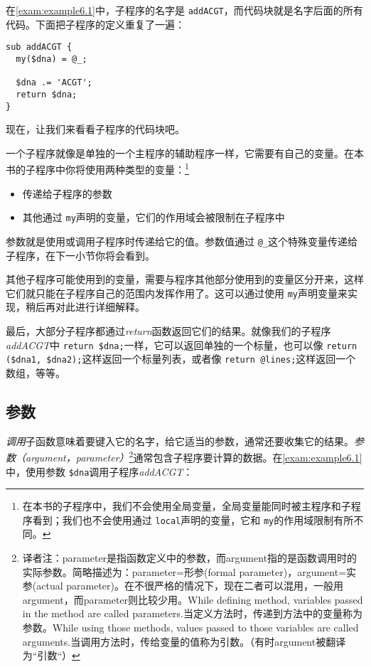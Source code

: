 在\autoref{exam:example6.1}中，子程序的名字是  \verb|addACGT|，而代码块就是名字后面的所有代码。下面把子程序的定义重复了一遍：

\begin{lstlisting}
sub addACGT {
  my($dna) = @_;

  $dna .= 'ACGT';
  return $dna;
}
\end{lstlisting}

现在，让我们来看看子程序的代码块吧。

一个子程序就像是单独的一个主程序的辅助程序一样，它需要有自己的变量。在本书的子程序中你将使用两种类型的变量：\footnote{在本书的子程序中，我们不会使用全局变量，全局变量能同时被主程序和子程序看到；我们也不会使用通过  \verb|local|声明的变量，它和  \verb|my|的作用域限制有所不同。}

\begin{itemize}
  \item 传递给子程序的参数
  \item 其他通过 \verb|my|声明的变量，它们的作用域会被限制在子程序中
\end{itemize}

参数就是使用或调用子程序时传递给它的值。参数值通过 \verb|@_|这个特殊变量传递给子程序，在下一小节你将会看到。

其他子程序可能使用到的变量，需要与程序其他部分使用到的变量区分开来，这样它们就只能在子程序自己的范围内发挥作用了。这可以通过使用 \verb|my|声明变量来实现，稍后再对此进行详细解释。

最后，大部分子程序都通过\textit{return}函数返回它们的结果。就像我们的子程序\textit{addACGT}中 \verb|return $dna;|一样，它可以返回单独的一个标量，也可以像 \verb|return ($dna1, $dna2);|这样返回一个标量列表，或者像 \verb|return @lines;|这样返回一个数组，等等。

\subsection{参数}
\textit{调用}子函数意味着要键入它的名字，给它适当的参数，通常还要收集它的结果。\textit{参数（argument，parameter）}\footnote{译者注：parameter是指函数定义中的参数，而argument指的是函数调用时的实际参数。简略描述为：parameter=形参(formal parameter)，argument=实参(actual parameter)。在不很严格的情况下，现在二者可以混用，一般用argument，而parameter则比较少用。While defining method, variables passed in the method are called parameters.当定义方法时，传递到方法中的变量称为参数。While using those methods, values passed to those variables are called arguments.当调用方法时，传给变量的值称为引数。（有时argument被翻译为“引数“）}通常包含子程序要计算的数据。在\autoref{exam:example6.1}中，使用参数 \verb|$dna|调用子程序\textit{addACGT}：

